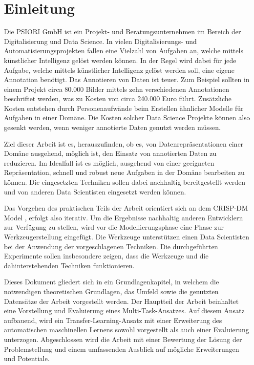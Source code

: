 \listoftodos

\chapter{Einleitung}
\label{chap:Einleitung}
	Die PSIORI GmbH \cite{PSIORIGmbH.2020} ist ein Projekt- und Beratungsunternehmen im Bereich der Digitalisierung und Data Science. In vielen Digitalisierungs- und Automatisierungsprojekten fallen eine Vielzahl von Aufgaben an, welche mittels künstlicher Intelligenz gelöst werden können. In der Regel wird dabei für jede Aufgabe, welche mittels künstlicher Intelligenz gelöst werden soll, eine eigene Annotation benötigt. Das Annotieren von Daten ist teuer. Zum Beispiel sollten in einem Projekt circa 80.000 Bilder mittels zehn verschiedenen Annotationen beschriftet werden, was zu Kosten von circa 240.000 Euro führt. Zusätzliche Kosten entstehen durch Personenaufwände beim Erstellen ähnlicher Modelle für Aufgaben in einer Domäne. Die Kosten solcher Data Science Projekte können also gesenkt werden, wenn weniger annotierte Daten genutzt werden müssen.
	
	Ziel dieser Arbeit ist es, herauszufinden, ob es, von Datenrepräsentationen einer Domäne ausgehend, möglich ist, den Einsatz von annotierten Daten zu reduzieren. Im Idealfall ist es möglich, ausgehend von einer geeigneten Repräsentation, schnell und robust neue Aufgaben in der Domäne bearbeiten zu können. Die eingesetzten Techniken sollen dabei nachhaltig bereitgestellt werden und von anderen Data Scientisten eingesetzt werden können. 
	
	Das Vorgehen des praktischen Teils der Arbeit orientiert sich an dem CRISP-DM Model \cite{Shearer.2000}, erfolgt also iterativ. Um die Ergebnisse nachhaltig anderen Entwicklern zur Verfügung zu stellen, wird vor die Modellierungsphase eine Phase zur Werkzeugerstellung eingefügt. Die Werkzeuge unterstützen einen Data Scientisten bei der Anwendung der vorgeschlagenen Techniken. Die durchgeführten Experimente sollen insbesondere zeigen, dass die Werkzeuge und die dahinterstehenden Techniken funktionieren. 
	
	Dieses Dokument gliedert sich in ein Grundlagenkapitel, in welchem die notwendigen theoretischen Grundlagen, das Umfeld sowie die genutzten Datensätze der Arbeit vorgestellt werden. Der Hauptteil der Arbeit beinhaltet eine  Vorstellung und Evaluierung eines Multi-Task-Ansatzes. Auf diesem Ansatz aufbauend, wird ein Transfer-Learning-Ansatz mit einer Erweiterung des automatischen maschinellen Lernens sowohl vorgestellt als auch einer Evaluierung unterzogen. Abgeschlossen wird die Arbeit mit einer Bewertung der Lösung der Problemstellung und einem umfassenden Ausblick auf mögliche Erweiterungen und Potentiale.
